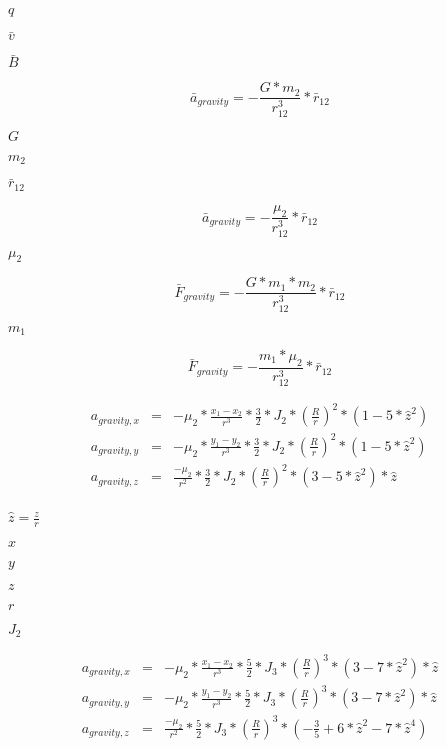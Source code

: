 \documentclass{article}
\begin{document}
$q$
\pagebreak

$\bar{v}$
\pagebreak

$\bar{B}$
\pagebreak

\[ \bar{a}_{gravity} = -\frac{G * m_{2}}{r_{12}^{3}} * \bar{r}_{12} \]
\pagebreak

$G$
\pagebreak

$m_{2}$
\pagebreak

$\bar{r}_{12}$
\pagebreak

\[ \bar{a}_{gravity} = -\frac{\mu_{2}}{r_{12}^{3}} * \bar{r}_{12} \]
\pagebreak

$\mu_{2}$
\pagebreak

\[ \bar{F}_{gravity} = -\frac{G * m_{1} * m_{2}}{r_{12}^{3}} * \bar{r}_{12} \]
\pagebreak

$m_{1}$
\pagebreak

\[ \bar{F}_{gravity} = -\frac{m_{1} * \mu_{2}}{r_{12}^{3}} * \bar{r}_{12} \]
\pagebreak

\begin{eqnarray*} {a}_{gravity,x} &=& -\mu_{2}*\frac{x_{1}-x_{2}}{r^{3}} * \frac{3}{2}*J_{2} * \left(\frac{R}{r}\right)^{2} * (1-5*\hat{z}^2) \\ {a}_{gravity,y} &=& -\mu_{2}*\frac{y_{1}-y_{2}}{r^{3}} * \frac{3}{2}*J_{2} * \left(\frac{R}{r}\right)^{2} * (1-5*\hat{z}^2) \\ {a}_{gravity,z} &=& \frac{-\mu_{2}}{r^{2}} * \frac{3}{2}*J_{2} * \left(\frac{R}{r}\right)^{2} * (3-5*\hat{z}^2) * \hat{z} \\ \end{eqnarray*}
\pagebreak

$\hat{z} = \frac{z}{r}$
\pagebreak

$x$
\pagebreak

$y$
\pagebreak

$z$
\pagebreak

$r$
\pagebreak

$J_{2}$
\pagebreak

\begin{eqnarray*} {a}_{gravity,x} &=& -\mu_{2}*\frac{x_{1}-x_{2}}{r^{3}} * \frac{5}{2}*J_{3} * \left(\frac{R}{r}\right)^{3} * (3-7*\hat{z}^2) * \hat{z} \\ {a}_{gravity,y} &=& -\mu_{2}*\frac{y_{1}-y_{2}}{r^{3}} * \frac{5}{2}*J_{3} * \left(\frac{R}{r}\right)^{3} * (3-7*\hat{z}^2) * \hat{z} \\ {a}_{gravity,z} &=& \frac{-\mu_{2}}{r^{2}} * \frac{5}{2}*J_{3} * \left(\frac{R}{r}\right)^{3} * (-\frac{3}{5}+6*\hat{z}^2-7*\hat{z}^4) \\ \end{eqnarray*}
\pagebreak
\end{document}
